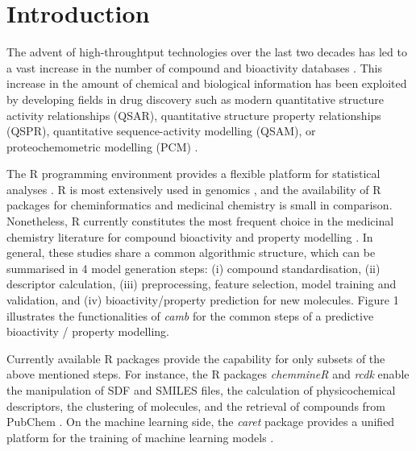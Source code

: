 \documentclass[twoside,a4wide,10pt]{article}
\begin{document}
\section*{Introduction}

The advent of high-throughtput technologies over the last two decades 
has led to a vast increase in the number of compound and bioactivity databases \citep{bender_databases,chembl,pubchem}.
This increase in the amount of chemical and biological information 
has been exploited by developing fields in drug discovery 
such as modern quantitative structure activity relationships (QSAR), 
quantitative structure property relationships (QSPR), quantitative sequence-activity modelling (QSAM), 
or proteochemometric modelling (PCM) \citep{review_pcm,cortesReview}.

The R programming environment provides a flexible platform for statistical analyses \citep{Rlanguage}.
R is most extensively used in genomics \citep{bioconductor},
and the availability of R packages for cheminformatics and medicinal chemistry is small in comparison.
Nonetheless, R currently constitutes the most frequent choice in the medicinal chemistry literature
for compound bioactivity and property modelling \citep{mente}.
In general, these studies share a common algorithmic structure, which can be summarised in 4 model generation steps:
(i) compound standardisation, (ii) descriptor calculation,
(iii) preprocessing, feature selection, model training and validation, and (iv) bioactivity/property prediction for new molecules.
Figure 1 illustrates the functionalities of {\it camb} for the common
steps of a predictive bioactivity / property modelling.

Currently available R packages provide the capability for only subsets of the above mentioned steps.
For instance, the R packages {\it chemmineR} \citep{chemmineR} and {\it rcdk} \citep{rcdk} enable the manipulation of SDF and SMILES
files, the calculation of physicochemical descriptors, the clustering of molecules,
and the retrieval of compounds from PubChem \citep{pubchem}.
On the machine learning side, the {\it caret} package provides a
unified platform for the training of machine learning models \citep{caret}.
\end{document}
